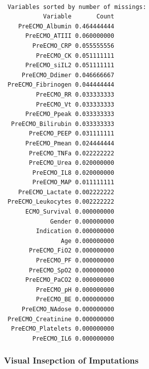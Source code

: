 \documentclass[12pt,]{article}
\begin{document}
\begin{verbatim}

 Variables sorted by number of missings: 
           Variable       Count
    PreECMO_Albumin 0.464444444
      PreECMO_ATIII 0.060000000
        PreECMO_CRP 0.055555556
         PreECMO_CK 0.051111111
      PreECMO_siIL2 0.051111111
     PreECMO_Ddimer 0.046666667
 PreECMO_Fibrinogen 0.044444444
         PreECMO_RR 0.033333333
         PreECMO_Vt 0.033333333
      PreECMO_Ppeak 0.033333333
  PreECMO_Bilirubin 0.033333333
       PreECMO_PEEP 0.031111111
      PreECMO_Pmean 0.024444444
       PreECMO_TNFa 0.022222222
       PreECMO_Urea 0.020000000
        PreECMO_IL8 0.020000000
        PreECMO_MAP 0.011111111
    PreECMO_Lactate 0.002222222
 PreECMO_Leukocytes 0.002222222
      ECMO_Survival 0.000000000
             Gender 0.000000000
         Indication 0.000000000
                Age 0.000000000
       PreECMO_FiO2 0.000000000
         PreECMO_PF 0.000000000
       PreECMO_SpO2 0.000000000
      PreECMO_PaCO2 0.000000000
         PreECMO_pH 0.000000000
         PreECMO_BE 0.000000000
     PreECMO_NAdose 0.000000000
 PreECMO_Creatinine 0.000000000
  PreECMO_Platelets 0.000000000
        PreECMO_IL6 0.000000000
\end{verbatim}

\subsubsection{Visual Insepction of
Imputations}\label{visual-insepction-of-imputations}
\end{document}
